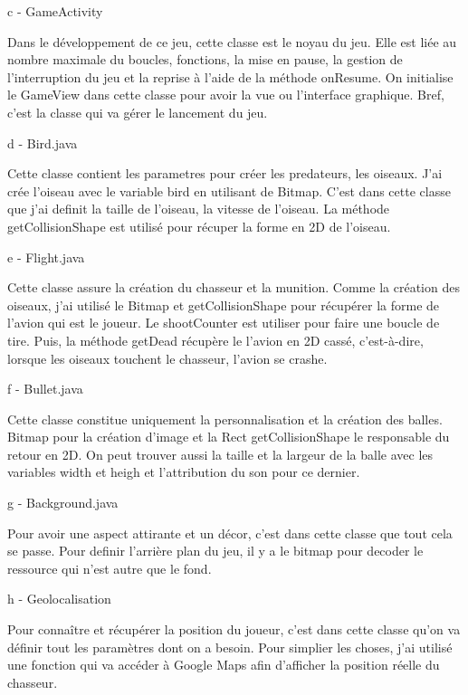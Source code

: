 \documentclass{rapportECL}
\begin{document}
c - GameActivity

Dans le développement de ce jeu, cette classe est le noyau du jeu. Elle est liée au nombre maximale du boucles, fonctions, la mise en pause, la gestion de l'interruption du jeu et la reprise à l'aide de la méthode onResume. On initialise le GameView dans cette classe pour avoir la vue ou l'interface graphique. Bref, c'est la classe qui va gérer le lancement du jeu. \newline

d - Bird.java

Cette classe contient les parametres pour créer les predateurs, les oiseaux. J'ai crée l'oiseau avec le variable bird en utilisant de Bitmap. C'est dans cette classe que j'ai definit la taille de l'oiseau, la vitesse de l'oiseau. La méthode getCollisionShape est utilisé pour récuper la forme en 2D de l'oiseau. \newline

e - Flight.java

Cette classe assure la création du chasseur et la munition. Comme la création des oiseaux, j'ai utilisé le Bitmap et getCollisionShape pour récupérer la forme de l'avion qui est le joueur. Le shootCounter est utiliser pour faire une boucle de tire. Puis, la méthode getDead récupère le l'avion en 2D cassé, c'est-à-dire, lorsque les oiseaux touchent le chasseur, l'avion se crashe.\newline

f - Bullet.java

Cette classe constitue uniquement la personnalisation et la création des balles. Bitmap pour la création d'image et la Rect getCollisionShape le responsable du retour en 2D. On peut trouver aussi la taille et la largeur de la balle avec les variables width et heigh et l'attribution du son\cite{Son} pour ce dernier. \newline

g - Background.java

Pour avoir une aspect attirante et un décor, c'est dans cette classe que tout cela se passe. Pour definir l'arrière plan du jeu, il y a le bitmap pour decoder le ressource qui n'est autre que le fond\cite{Images}.\newline

h - Geolocalisation

Pour connaître et récupérer la position du joueur, c'est dans cette classe qu'on va définir tout les paramètres\cite{AndroidStudio} dont on a besoin. Pour simplier les choses, j'ai utilisé une fonction qui va accéder à Google Maps afin d'afficher la position réelle du chasseur.\newline
\end{document}
